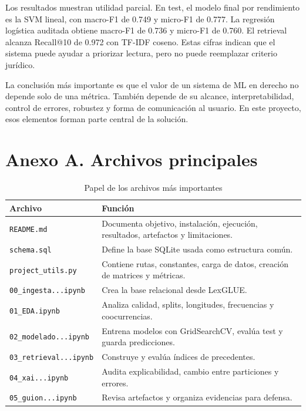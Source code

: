 \documentclass[11pt,a4paper]{article}
\begin{document}
Los resultados muestran utilidad parcial. En test, el modelo final por rendimiento es la SVM lineal, con macro-F1 de 0.749 y micro-F1 de 0.777. La regresión logística auditada obtiene macro-F1 de 0.736 y micro-F1 de 0.760. El retrieval alcanza Recall@10 de 0.972 con TF-IDF coseno. Estas cifras indican que el sistema puede ayudar a priorizar lectura, pero no puede reemplazar criterio jurídico.

La conclusión más importante es que el valor de un sistema de ML en derecho no depende solo de una métrica. También depende de su alcance, interpretabilidad, control de errores, robustez y forma de comunicación al usuario. En este proyecto, esos elementos forman parte central de la solución.

\appendix

\section{Anexo A. Archivos principales}
\label{anexo_archivos}

\begin{table}[H]
\centering
\caption{Papel de los archivos más importantes}
\small
\begin{tabular}{@{}p{}p{}@{}}
\toprule
\textbf{Archivo} & \textbf{Función}\\
\midrule
\texttt{README.md} & Documenta objetivo, instalación, ejecución, resultados, artefactos y limitaciones.\\
\texttt{schema.sql} & Define la base SQLite usada como estructura común.\\
\texttt{project\_utils.py} & Contiene rutas, constantes, carga de datos, creación de matrices y métricas.\\
\texttt{00\_ingesta...ipynb} & Crea la base relacional desde LexGLUE.\\
\texttt{01\_EDA.ipynb} & Analiza calidad, splits, longitudes, frecuencias y coocurrencias.\\
\texttt{02\_modelado...ipynb} & Entrena modelos con GridSearchCV, evalúa test y guarda predicciones.\\
\texttt{03\_retrieval...ipynb} & Construye y evalúa índices de precedentes.\\
\texttt{04\_xai...ipynb} & Audita explicabilidad, cambio entre particiones y errores.\\
\texttt{05\_guion...ipynb} & Revisa artefactos y organiza evidencias para defensa.\\
\bottomrule
\end{tabular}
\end{table}
\end{document}

